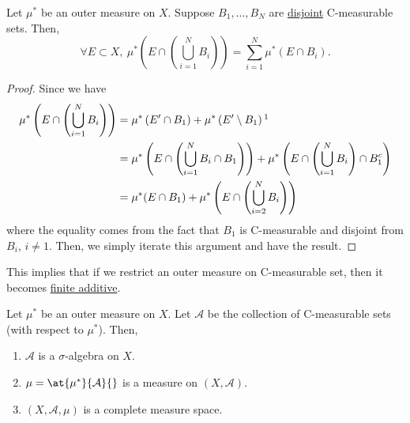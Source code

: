 \begin{lemma}\label{lma:disjoint-C-measurable-finite-additive}
	Let \(\mu^{*} \) be an outer measure on \(X\). Suppose \(B_1, \ldots , B_N \) are \underline{disjoint} C-measurable sets.
	Then,
	\[
		\forall E\subset X,\ \mu^{*} \left(E\cap \left(\bigcup\limits_{i=1}^{N} B_{i}\right)\right) = \sum\limits_{i=1}^{N} \mu^{*} \left(E\cap B_i\right).
	\]
\end{lemma}
\begin{proof}
	Since we have
	\[
		\begin{split}
			\mu^{*} \left(E\cap \left(\bigcup\limits_{i=1}^{N} B_{i}\right)\right)
			&= \mu^{*} \left( E^\prime  \cap B_1\right) + \mu^{*} \left(E ^\prime \setminus B_1\right)\footnotemark\\
			&= \mu^{*} \left(E\cap \left(\bigcup\limits_{i=1}^{N} B_{i}\cap B_1\right)\right) + \mu^{*} \left(E\cap \left(\bigcup\limits_{i=1}^{N} B_{i}\right)\cap B^{c}_1\right)\\
			&= \mu^{*} (E\cap B_1) + \mu^{*} \left(E\cap \left(\bigcup\limits_{i=2}^{N} B_{i}\right)\right)
		\end{split}
	\]
	where the equality comes from the fact that \(B_1 \) is C-measurable and disjoint from \(B_{i}\), \(i\neq 1\). Then, we simply iterate this argument
	and have the result.
\end{proof}
\begin{remark}
	This implies that if we restrict an outer measure on C-measurable set, then it becomes \underline{finite additive}.
\end{remark}

\begin{theorem}\label{thm:Caratheodory-extension-Thm}
	Let \(\mu^{*} \) be an outer measure on \(X\). Let \(\mathcal{A} \) be the collection of C-measurable sets (with respect to \(\mu^{*} \)).
	Then,
	\begin{enumerate}
		\item \(\mathcal{A}\) is a \(\sigma\)-algebra on \(X\).
		\item \(\mu = \at{\mu^{*} }{\mathcal{A} }{}\) is a measure on \((X, \mathcal{A})\).
		\item \((X, \mathcal{A} , \mu)\) is a complete measure space.
	\end{enumerate}
\end{theorem}

